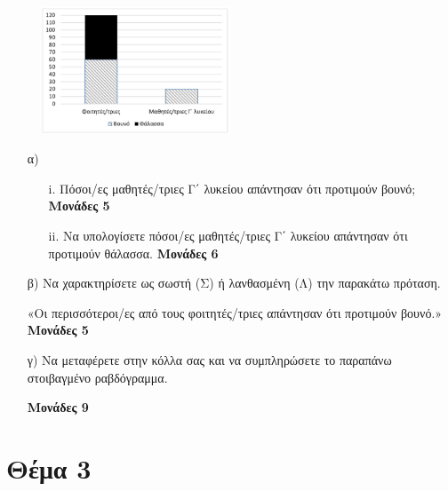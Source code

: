 \documentclass[12pt]{extarticle}
\begin{document}
\begin{figure}[h]
    \includegraphics[width=0.5\textwidth]{2023.png}
    \centering
\end{figure}

\begin{enumerate}
    \item[α)]
        \begin{enumerate}
            \item[i.] Πόσοι/ες μαθητές/τριες Γ΄ λυκείου απάντησαν ότι προτιμούν βουνό;\hspace*{\fill} \textbf{Μονάδες 5}
            \item[ii.] Να υπολογίσετε πόσοι/ες μαθητές/τριες Γ΄ λυκείου απάντησαν ότι προτιμούν θάλασσα.\hspace*{\fill} \textbf{Μονάδες 6}
        \end{enumerate}
    \item[β)] Να χαρακτηρίσετε ως σωστή (Σ) ή λανθασμένη (Λ) την παρακάτω πρόταση.

        «Οι περισσότεροι/ες από τους φοιτητές/τριες απάντησαν ότι προτιμούν βουνό.»
        \hspace*{\fill} \textbf{Μονάδες 5}
    \item[γ)] Να μεταφέρετε στην κόλλα σας και να συμπληρώσετε το παραπάνω στοιβαγμένο ραβδόγραμμα.

        \hspace*{\fill} \textbf{Μονάδες 9}
\end{enumerate}

\section*{Θέμα 3}
\noindent
\end{document}
